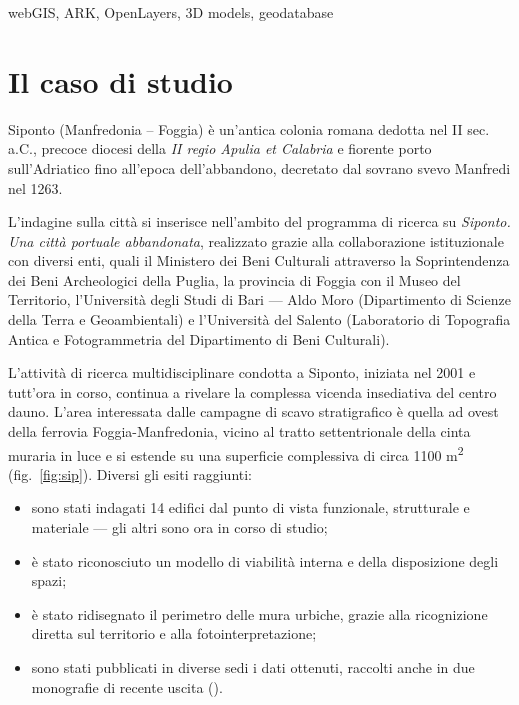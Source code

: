 \documentclass{paper}
\begin{document}
\begin{keywords}
    webGIS, ARK, OpenLayers, 3D models, geodatabase
\end{keywords}

\pagebreak{}

\section{Il caso di studio}

    Siponto (Manfredonia -- Foggia) è un'antica colonia romana dedotta nel II sec. a.C., precoce diocesi della \emph{II regio Apulia et Calabria} e fiorente porto sull'Adriatico fino all'epoca dell'abbandono, decretato dal sovrano svevo Manfredi nel 1263. 

    L'indagine sulla città si inserisce nell'ambito del programma di ricerca su \emph{Siponto. Una città portuale abbandonata}, realizzato grazie alla collaborazione istituzionale con diversi enti, quali il Ministero dei Beni Culturali attraverso la Soprintendenza dei Beni Archeologici della Puglia, la provincia di Foggia con il Museo del Territorio, l'Università degli Studi di Bari --- Aldo Moro (Dipartimento di Scienze della Terra e Geoambientali) e l'Università del Salento (Laboratorio di Topografia Antica e Fotogrammetria del Dipartimento di Beni Culturali). 

    L'attività di ricerca multidisciplinare condotta a Siponto, iniziata nel 2001 e tutt'ora in corso, continua a rivelare la complessa vicenda insediativa del centro dauno. L'area interessata dalle campagne di scavo stratigrafico è quella ad ovest della ferrovia Foggia-Manfredonia, vicino al tratto settentrionale della cinta muraria in luce e si estende su una superficie complessiva di circa 1100 \si{\meter\squared} (fig.~\ref{fig:sip}). Diversi gli esiti raggiunti:
    \begin{itemize}
        \item sono stati indagati 14 edifici dal punto di vista funzionale, strutturale e materiale --- gli altri sono ora in corso di studio;
        \item è stato riconosciuto un modello di viabilità interna e della disposizione degli spazi; 
        \item è stato ridisegnato il perimetro delle mura urbiche, grazie alla ricognizione diretta sul territorio e alla fotointerpretazione;
        \item sono stati pubblicati in diverse sedi i dati ottenuti, raccolti anche in due monografie di recente uscita (\cite{siponto-abbandonata-medioevo,case-cose}).
    \end{itemize}
\end{document}
